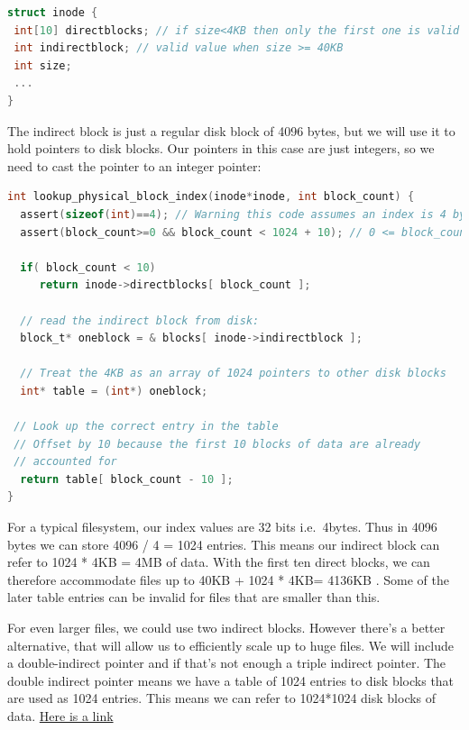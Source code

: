 \begin{lstlisting}[language=C]
struct inode {
 int[10] directblocks; // if size<4KB then only the first one is valid
 int indirectblock; // valid value when size >= 40KB
 int size;
 ...
}
\end{lstlisting}

The indirect block is just a regular disk block of 4096 bytes, but we will use it to hold pointers to disk blocks. Our pointers in this case are just integers, so we need to cast the pointer to an integer pointer:

\begin{lstlisting}[language=C]
int lookup_physical_block_index(inode*inode, int block_count) {
  assert(sizeof(int)==4); // Warning this code assumes an index is 4 bytes!
  assert(block_count>=0 && block_count < 1024 + 10); // 0 <= block_count< 1034

  if( block_count < 10)
     return inode->directblocks[ block_count ];

  // read the indirect block from disk:
  block_t* oneblock = & blocks[ inode->indirectblock ];

  // Treat the 4KB as an array of 1024 pointers to other disk blocks
  int* table = (int*) oneblock;

 // Look up the correct entry in the table
 // Offset by 10 because the first 10 blocks of data are already
 // accounted for
  return table[ block_count - 10 ];
}
\end{lstlisting}

For a typical filesystem, our index values are 32 bits i.e.~4bytes. Thus in 4096 bytes we can store 4096 / 4 = 1024 entries. This means our indirect block can refer to 1024 * 4KB = 4MB of data. With the first ten direct blocks, we can therefore accommodate files up to 40KB + 1024 * 4KB= 4136KB . Some of the later table entries can be invalid for files that are smaller than this.

For even larger files, we could use two indirect blocks. However there's a better alternative, that will allow us to efficiently scale up to huge files. We will include a double-indirect pointer and if that's not enough a triple indirect pointer. The double indirect pointer means we have a table of 1024 entries to disk blocks that are used as 1024 entries. This means we can refer to 1024*1024 disk blocks of data. \href{http://uw714doc.sco.com/en/FS\_admin/graphics/s5chain.gif}{Here is a link}


